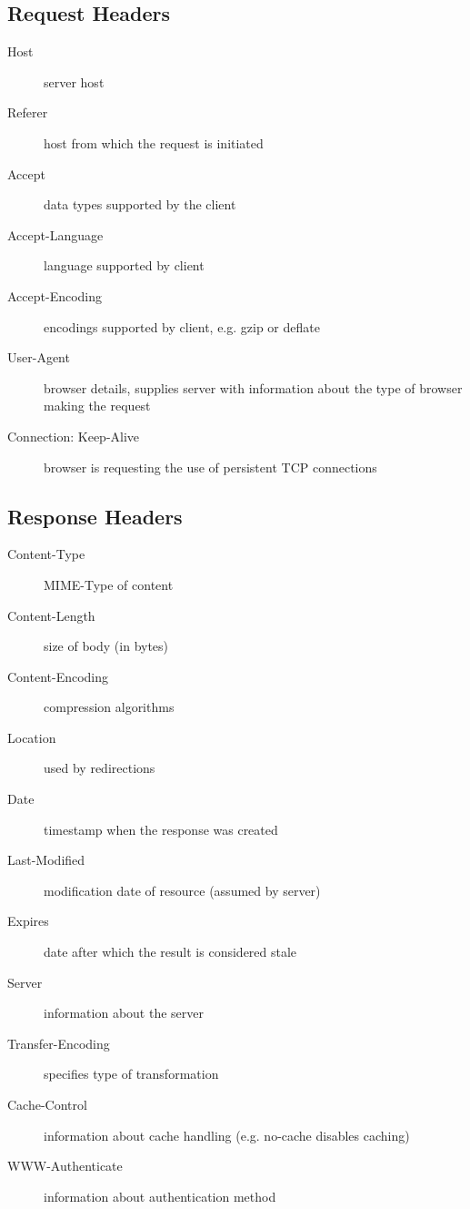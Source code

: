 \documentclass[10pt]{article}
\begin{document}
\subsection{Request Headers}
\begin{description}
	\item[Host] server host 
	\item[Referer] host from which the request is initiated
	\item[Accept] data types supported by the client 
	\item[Accept-Language] language supported by client
	\item[Accept-Encoding] encodings supported by client, e.g. gzip or deflate
	\item[User-Agent] browser details, supplies server with information about the type of browser making the request
	\item[Connection: Keep-Alive] browser is requesting the use of persistent TCP connections
\end{description}
\subsection{Response Headers}
\begin{description}
	\item[Content-Type] MIME-Type of content
	\item[Content-Length] size of body (in bytes)
	\item[Content-Encoding] compression algorithms
	\item[Location] used by redirections
	\item[Date] timestamp when the response was created 
	\item[Last-Modified] modification date of resource (assumed by server) 
	\item[Expires] date after which the result is considered stale 
	\item[Server] information about the server
	\item[Transfer-Encoding] specifies type of transformation
	\item[Cache-Control] information about cache handling (e.g. no-cache disables caching)
	\item[WWW-Authenticate] information about authentication method
\end{description}
\end{document}
